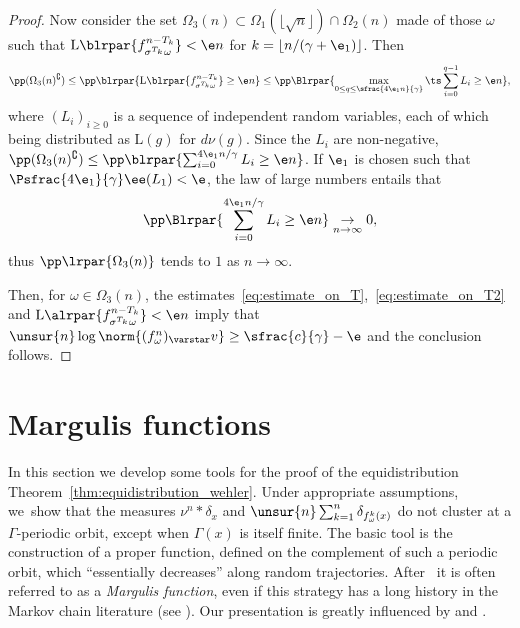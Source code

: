 \begin{proof}
Now consider the set $\Omega_3(n)\subset \Omega_1(\lfloor\sqrt{n}\rfloor)\cap \Omega_2(n)$ made of those
$\omega$ such that $\mathrm L\blrpar{ f^{n-T_{k}}_{\sigma^{T_{k} }\omega}} < \e n$ for $k= \lfloor n/(\gamma+\e_1)\rfloor $. Then
\begin{equation*}
\pp(\Omega_3(n)^\complement)\leq \pp\blrpar{\mathrm L\blrpar{ f^{n-T_{k}}_{\sigma^{T_{k} }\omega}} \geq \e n}\leq
\pp\Blrpar{\max_{0\leq q\leq \sfrac{4\e_1n}{\gamma}} \ts\sum_{i=0}^{q-1} L_i \geq \e n},
\end{equation*}
where $(L_i)_{i\geq 0}$ is a sequence of independent random variables, each of which being
distributed as $\mathrm L(g)$ for $d\nu(g)$. Since the $L_i$ are non-negative, $\pp(\Omega_3(n)^\complement)\leq\pp\blrpar{ \sum_{i=0}^{4\e_1 n/\gamma} L_i \geq\nobreak \e n}$. If $\e_1$ is chosen such that $\Psfrac{4\e_1}{\gamma} \ee(L_1) < \e$, the law of large numbers entails that
\begin{equation*}
\pp \Blrpar{ \sum_{i=0}^{4\e_1 n/\gamma} L_i \geq \e n} \underset{n\to\infty}\to 0,
\end{equation*}
thus $ \pp \lrpar{ \Omega_3(n)}$ tends to $1$ as $n\to \infty$.

Then, for $\omega \in \Omega_3(n)$, the estimates~\eqref{eq:estimate_on_T},~\eqref{eq:estimate_on_T2}
and $\mathrm L\alrpar{ f^{n-T_{k}}_{\sigma^{T_{k} }\omega}} < \e n$ imply that
$\unsur{n}\log \norm{(f^n_\omega)_\varstar v}\geq \sfrac{c}{\gamma}-\e$
and the conclusion follows.
\end{proof}

\section{Margulis functions}\label{sec:margulis}

In this section we develop some tools for the proof of the equidistribution
Theorem~\ref{thm:equidistribution_wehler}.
Under appropriate assumptions, we~show that the measures
$\nu^n\ast \delta_x$ and $\unsur{n}\sum_{k=1}^n \delta_{f^k_\omega(x)}$
do not cluster at a $\Gamma$-periodic orbit, except when $\Gamma(x)$ is itself finite.
The basic tool is the construction of a proper function, defined on the complement of such a periodic orbit,
which ``essentially decreases''
along random trajectories. After~\cite{eskin-margulis}
it is often
referred to as a \emph{Margulis function}, even if this strategy has a long history in the Markov chain literature (see
\cite{meyn-tweedie}). Our presentation is greatly influenced by \cite{benoist-quint3} and
\cite{benard-desaxce}.

